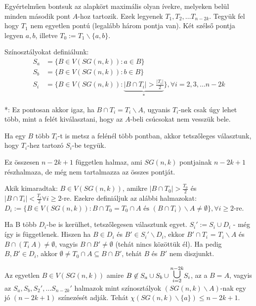 \medskip

Egyértelműen bontsuk az alapkört maximális olyan ívekre, melyeken belül minden második pont $A$-hoz tartozik. Ezek legyenek $T_1, T_2, \dots T_{n-2k}$. Tegyük fel hogy $T_1$ nem egyetlen pontú (legalább három pontja van). Két szélső pontja legyen $a, b$, illetve $T_0 := T_1 \backslash \{a, b\}$.

\medskip

Színosztályokat definiálunk:
\begin{align}
  S_a &= \{B \in V(SG(n,k)): a \in B\} \\
  S_b &= \{B \in V(SG(n,k)): b \in B\} \\
  S_i &= \{B \in V(SG(n,k)): \underbrace{|B \cap T_i| > \frac{|T_i|}{2}}_{*}\}, \forall i = 2,3, \dots n-2k
\end{align}

*: Ez pontosan akkor igaz, ha $B \cap T_i = T_i \backslash A$, ugyanis $T_i$-nek csak úgy lehet több, mint a felét kiválasztani, hogy az $A$-beli csúcsokat nem vesszük bele.

\medskip

Ha egy $B$ több $T_i$-t is metsz a felénél több pontban, akkor tetszőleges választunk, hogy $T_i$-hez tartozó $S_i$-be tegyük.

\medskip

Ez összesen $n-2k+1$ független halmaz, ami $SG(n,k)$ pontjainak $n-2k+1$ részhalmaza, de még nem tartalmazza az összes pontját.

\medskip

Akik kimaradtak: $B \in V(SG(n,k))$, amikre $|B \cap T_0| > \frac{T_0}{2}$ és $|B \cap T_i| < \frac{T_i}{2} \forall i \geq 2$-re. Ezekre definiáljuk az alábbi halmazokat: $D_i := \{B \in V(SG(n,k)): B \cap T_0 = T_0 \cap A \text{~és~} (B \cap T_i) \backslash A \not = \emptyset\}, \forall i \geq 2$-re.

\medskip

Ha B több $D_i$-be is kerülhet, tetszőlegesen választunk egyet. $S_i' := S_i \cup D_i$ - még így is függetlenek. Hiszen ha $B \in D_i$ és $B' \in S_i' \backslash D_i$, ekkor $B' \cap T_i$ = $T_i \backslash A$ és $B \cap (T_i \ A) \not = \emptyset$, vagyis $B \cap B' \not = \emptyset$ (tehát nincs közöttük él). Ha pedig $B, B' \in D_i$, akkor $\emptyset \not = T_0 \cap A \subseteq B \cap B'$, tehát $B$ és $B'$ nem diszjunkt.

Az egyetlen $B \in V(SG(n,k))$ amire $B \not \in S_a \cup S_b \cup \cuploop{n-2k}{i=2} S_i$, az a $B=A$, vagyis az $S_a, S_b, S_2', \dots S_{n-2k}'$ halmazok mint színosztályok $(SG(n,k) \backslash A)$-nak egy jó $(n-2k+1)$ színezését adják. Tehát $\chi(SG(n,k) \backslash \{a\}) \leq n - 2k + 1$.

\QED

